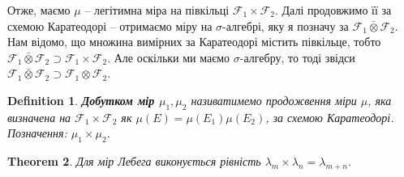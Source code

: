 \documentclass[a4paper, 10pt]{article}
\theoremstyle{theoremdd}
\newtheorem{theorem}{Theorem}[subsection]
\newtheorem{definition}[theorem]{Definition}
\begin{document}
\noindent
Отже, маємо $\mu$ -- легітимна міра на півкільці $\mathcal{F}_1 \times \mathcal{F}_2$. Далі продовжимо її за схемою Каратеодорі -- отримаємо міру на $\sigma$-алгебрі, яку я позначу за $\mathcal{F}_1 \bar{\otimes} \mathcal{F}_2$.\\
Нам відомо, що множина вимірних за Каратеодорі містить півкільце, тобто $\mathcal{F}_1 \bar{\otimes} \mathcal{F}_2 \supset \mathcal{F}_1 \times \mathcal{F}_2$. Але оскільки ми маємо $\sigma$-алгебру, то тоді звідси $\mathcal{F}_1 \bar{\otimes} \mathcal{F}_2 \supset \mathcal{F}_1 \otimes \mathcal{F}_2$.

\begin{definition}
\textbf{Добутком мір $\mu_1,\mu_2$} називатимемо продожвення міри $\mu$, яка визначена на $\mathcal{F}_1 \times \mathcal{F}_2$ як $\mu(E) = \mu(E_1) \mu(E_2)$, за схемою Каратеодорі.\\
Позначення: $\mu_1 \times \mu_2$.
\end{definition}

\begin{theorem}
Для мір Лебега виконується рівність $\lambda_m \times \lambda_n = \lambda_{m+n}$.
\end{theorem}
\end{document}
